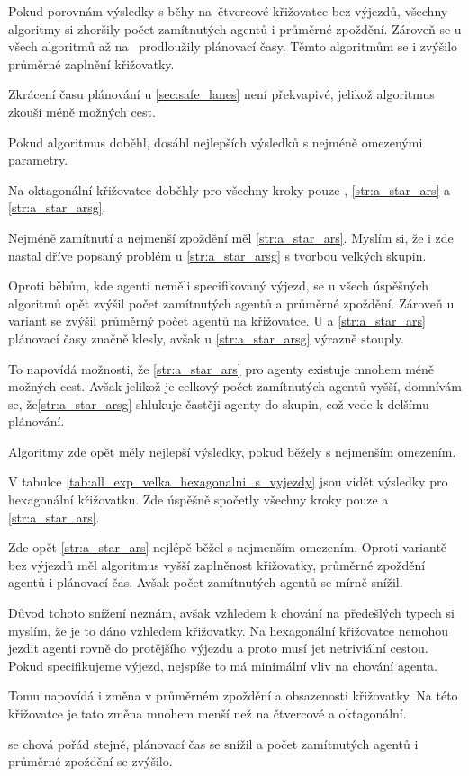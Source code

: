 Pokud porovnám výsledky s běhy na~čtvercové křižovatce bez výjezdů,
všechny algoritmy si zhoršily počet zamítnutých agentů i průměrné zpoždění.
Zároveň se u všech algoritmů až na~ prodloužily plánovací časy.
Těmto algoritmům se i zvýšilo průměrné zaplnění křižovatky.

Zkrácení času plánování u \ref{sec:safe_lanes} není překvapivé, jelikož algoritmus zkouší méně možných cest.

Pokud algoritmus doběhl, dosáhl nejlepších výsledků s nejméně omezenými parametry.



Na oktagonální křižovatce doběhly pro všechny kroky pouze
, \ref{str:a_star_ars} a \ref{str:a_star_arsg}.

Nejméně zamítnutí a nejmenší zpoždění měl \ref{str:a_star_ars}.
Myslím si, že i zde nastal dříve popsaný problém u \ref{str:a_star_arsg} s tvorbou velkých skupin.

Oproti běhům, kde agenti neměli specifikovaný výjezd,
se u všech úspěšných algoritmů opět zvýšil počet zamítnutých agentů a průměrné zpoždění.
Zároveň u  variant se zvýšil průměrný počet agentů na křižovatce.
U  a \ref{str:a_star_ars} plánovací časy značně klesly,
avšak u \ref{str:a_star_arsg} výrazně stouply.

To napovídá možnosti, že \ref{str:a_star_ars} pro agenty existuje mnohem méně možných cest.
Avšak jelikož je celkový počet zamítnutých agentů vyšší, domnívám se,
že\ref{str:a_star_arsg} shlukuje častěji agenty do skupin, což vede k delšímu plánování.

Algoritmy zde opět měly nejlepší výsledky, pokud běžely s nejmenším omezením.



V tabulce \ref{tab:all_exp_velka_hexagonalni_s_vyjezdy} jsou vidět výsledky pro hexagonální křižovatku.
Zde úspěšně spočetly všechny kroky pouze  a \ref{str:a_star_ars}.

Zde opět \ref{str:a_star_ars} nejlépě běžel s nejmenším omezením.
Oproti variantě bez výjezdů měl algoritmus vyšší zaplněnost křižovatky, průměrné zpoždění agentů i plánovací čas.
Avšak počet zamítnutých agentů se mírně snížil.

Důvod tohoto snížení neznám, avšak vzhledem k chování na předešlých typech si myslím,
že je to dáno vzhledem křižovatky.
Na hexagonální křižovatce nemohou jezdit agenti rovně do protějšího výjezdu a proto musí jet netriviální cestou.
Pokud specifikujeme výjezd, nejspíše to má minimální vliv na chování agenta.

Tomu napovídá i změna v průměrném zpoždění a obsazenosti křižovatky.
Na této křižovatce je tato změna mnohem menší než na čtvercové a oktagonální.

 se chová pořád stejně, plánovací čas se snížil a
počet zamítnutých agentů i průměrné zpoždění se zvýšilo.


